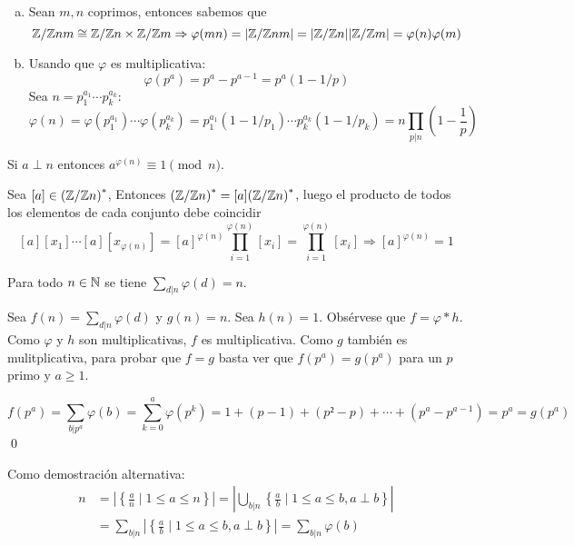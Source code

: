 \documentclass[TAN.tex]{subfiles}
\begin{document}
\begin{dem}
\begin{enumerate}[(a)]
\item Sean $m,n$ coprimos, entonces sabemos que 
$$
\mathbb{Z}/\mathbb{Z} nm \cong \mathbb{Z}/\mathbb{Z} n \times \mathbb{Z}/\mathbb{Z} m \Rightarrow \varphi(mn)= |\mathbb{Z}/\mathbb{Z} nm| = |\mathbb{Z}/\mathbb{Z} n||\mathbb{Z}/\mathbb{Z} m| = \varphi(n)\varphi(m)
$$

\item Usando que $φ$ es multiplicativa:
\[ φ(p^a) = p^a - p^{a-1} = p^a(1-1/p) \]
Sea $n = p_1^{a_1}\cdots p_k^{a_k}$:
\[ φ(n) = φ(p_1^{a_1})\cdots φ(p_k^{a_k}) = p_1^{a_1}(1-1/p_1)\cdots p_k^{a_k}(1-1/p_k) = n \prod_{p|n} \left(1-\dfrac{1}{p}\right)\]
\end{enumerate}
\QED
\end{dem}

\begin{teorema}
Si $a \perp n$ entonces $a^{φ(n)} \equiv 1 \pmod n$.
\end{teorema}
\begin{dem}
Sea $[a]\in {\left(\mathbb{Z}/\mathbb{Z}n\right)^\ast}$, Entonces ${\left(\mathbb{Z}/\mathbb{Z} n\right)^\ast} = [a]{\left(\mathbb{Z}/\mathbb{Z}n\right)^\ast}$, luego el producto de todos los elementos de cada conjunto debe coincidir
$$
[a][x_1]\cdots[a][x_{\varphi(n)}] = [a]^{\varphi(n)}\prod_{i=1}^{\varphi(n)} [x_i] = \prod_{i=1}^{\varphi(n)} [x_i] \Rightarrow [a]^{\varphi(n)} = 1
$$
\end{dem}
\begin{prop}
Para todo $n \in \mathbb{N}$ se tiene $\displaystyle\sum_{d|n} φ(d) = n$.
\end{prop}

\begin{dem}
Sea $f(n) = \sum_{d|n} φ(d)$ y $g(n) = n$. Sea $h(n) = 1$. Obsérvese que $f = φ * h$. Como $φ$ y $h$ son multiplicativas, $f$ es multiplicativa. Como $g$ también es mulitplicativa, para probar que $f = g$ basta ver que $f(p^a)=g(p^a)$ para un $p$ primo y $a ≥ 1$.

\[ f(p^a) = \sum_{b|p^a} φ(b) = \sum_{k=0}^a φ(p^k) = 1+(p-1)+(p²-p)+\cdots+(p^a-p^{a-1}) = p^a = g(p^a) \]
\qed

Como demostración alternativa:
\begin{align*}
n&= \left|\left\{\frac{a}{n} \mid 1 ≤ a ≤ n\right\}\right|
= \left|\bigcup_{b|n} \left\{\frac{a}{b} \mid 1≤a≤b, a \perp b\right\}\right|\\
&=\sum_{b|n} \left|\left\{\frac{a}{b} \mid 1 ≤ a ≤ b, a \perp b\right\}\right|
= \sum_{b|n} φ(b) 
\end{align*} \QED
\end{dem}
\end{document}
